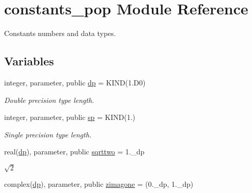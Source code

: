 \hypertarget{namespaceconstants__pop}{}\section{constants\+\_\+pop Module Reference}
\label{namespaceconstants__pop}


Constants numbers and data types.  


\subsection*{Variables}
\begin{DoxyCompactItemize}
\item 
\mbox{\label{namespaceconstants__pop_aa40e688cf9ef9b7cf0db05c80879ca15}} 
integer, parameter, public \mbox{\hyperlink{namespaceconstants__pop_aa40e688cf9ef9b7cf0db05c80879ca15}{dp}} = K\+I\+ND(1.\+D0)
\begin{DoxyCompactList}\small\item\em Double precision type length. \end{DoxyCompactList}\item 
\mbox{\label{namespaceconstants__pop_a30c1570dd8020fd168553df145d76ff4}} 
integer, parameter, public \mbox{\hyperlink{namespaceconstants__pop_a30c1570dd8020fd168553df145d76ff4}{sp}} = K\+I\+ND(1.)
\begin{DoxyCompactList}\small\item\em Single precision type length. \end{DoxyCompactList}\item 
\mbox{\label{namespaceconstants__pop_a31f741f0bab3c2deff3403f25fc8fca1}} 
real(\mbox{\hyperlink{namespaceconstants__pop_aa40e688cf9ef9b7cf0db05c80879ca15}{dp}}), parameter, public \mbox{\hyperlink{namespaceconstants__pop_a31f741f0bab3c2deff3403f25fc8fca1}{sqrttwo}} = 1.\+\_\+dp
\begin{DoxyCompactList}\small\item\em $\sqrt{2}$ \end{DoxyCompactList}\item 
\mbox{\label{namespaceconstants__pop_a05c3e12abc77506eb165034fba783f98}} 
complex(\mbox{\hyperlink{namespaceconstants__pop_aa40e688cf9ef9b7cf0db05c80879ca15}{dp}}), parameter, public \mbox{\hyperlink{namespaceconstants__pop_a05c3e12abc77506eb165034fba783f98}{zimagone}} = (0.\+\_\+dp, 1.\+\_\+dp)

\end{DoxyCompactItemize}
